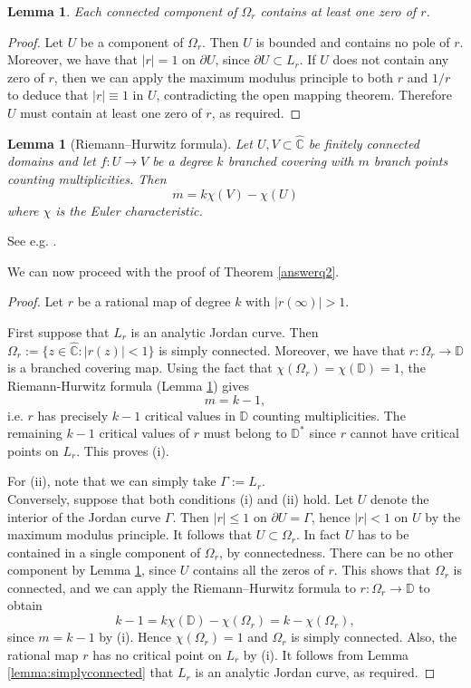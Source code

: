 \documentclass{amsart}
\theoremstyle{plain}
\newtheorem{lemma}[theorem]{Lemma}
\theoremstyle{definition}
\theoremstyle{remark}
\newcommand{\mD}{\mathbb{D}}
\newcommand{\hC}{\widehat{\mathbb{C}}}
\begin{document}
\begin{lemma}
\label{lemma:zeros}
Each connected component of $\Omega_r$ contains at least one zero of $r$.
\end{lemma}

\begin{proof}
Let $U$ be a component of $\Omega_r$. Then $U$ is bounded and contains no pole of $r$. Moreover, we have that $|r|=1$ on $\partial U$, since $\partial U \subset L_r$. If $U$ does not contain any zero of $r$, then we can apply the maximum modulus principle to both $r$ and $1/r$ to deduce that $|r| \equiv 1$ in $U$, contradicting the open mapping theorem. Therefore $U$ must contain at least one zero of $r$, as required.
\end{proof}

\begin{lemma}[Riemann--Hurwitz formula]
\label{lemma:rh}
Let $U,V \subset \hC$ be finitely connected domains and let $f:U \to V$ be a degree $k$ branched covering with $m$ branch points counting multiplicities. Then
$$m = k \chi(V) - \chi(U)$$
where $\chi$ is the Euler characteristic.
\end{lemma}

See e.g. \cite[Theorem 12.47]{Zakeri2021}.


We can now proceed with the proof of Theorem \ref{answerq2}.


\begin{proof}
Let $r$ be a rational map of degree $k$ with $|r(\infty)|>1$.

First suppose that $L_r$ is an analytic Jordan curve. Then $\Omega_r:=\{z \in \hC:|r(z)|<1\}$ is simply connected. Moreover, we have that $r:\Omega_r \to \mD$ is a branched covering map. Using the fact that $\chi(\Omega_r)=\chi(\mD)=1$, the Riemann-Hurwitz formula (Lemma \ref{lemma:rh}) gives
$$m=k-1,$$
i.e. $r$ has precisely $k-1$ critical values in $\mD$ counting multiplicities. The remaining $k-1$ critical values of $r$ must belong to $\mD^*$ since $r$ cannot have critical points on $L_r$. This proves (i).

For (ii), note that we can simply take $\Gamma:=L_r$.
\\

Conversely, suppose that both conditions (i) and (ii) hold. Let $U$ denote the interior of the Jordan curve $\Gamma$. Then $|r| \leq 1$ on $\partial U = \Gamma$, hence $|r|<1$ on $U$ by the maximum modulus principle. It follows that $U \subset \Omega_r$. In fact $U$ has to be contained in a single component of $\Omega_r$, by connectedness. There can be no other component by Lemma \ref{lemma:zeros}, since $U$ contains all the zeros of $r$. This shows that $\Omega_r$ is connected, and we can apply the Riemann--Hurwitz formula to $r:\Omega_r \to \mD$ to obtain
$$k-1=k\chi(\mD) - \chi(\Omega_r)=k-\chi(\Omega_r),$$
since $m=k-1$ by (i). Hence $\chi(\Omega_r)=1$ and $\Omega_r$ is simply connected. Also, the rational map $r$ has no critical point on $L_r$ by (i). It follows from Lemma \ref{lemma:simplyconnected} that $L_r$ is an analytic Jordan curve, as required.
\end{proof}


\end{document}
